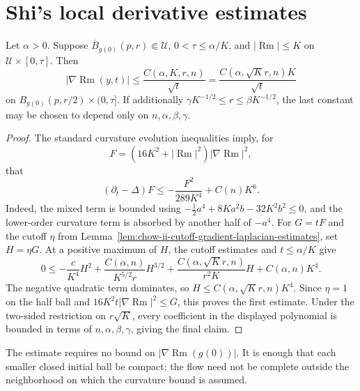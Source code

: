 \section{Shi's local derivative estimates}

\begin{theorem}
\label{thm:chow-ii-shi-local-first-derivative-estimate}


Let \(\alpha>0\).  Suppose \(\overline B_{g(0)}(p,r)\Subset\mathcal U\),
\(0<\tau\le\alpha/K\), and \(|\operatorname{Rm}|\le K\) on
\(\mathcal U\times[0,\tau]\).  Then
\[
|\nabla\operatorname{Rm}(y,t)|\le
\frac{C(\alpha,K,r,n)}{\sqrt t}
=\frac{C(\alpha,\sqrt K r,n)K}{\sqrt t}
\]
on \(B_{g(0)}(p,r/2)\times(0,\tau]\).  If additionally
\(\gamma K^{-1/2}\le r\le\beta K^{-1/2}\), the last constant may be chosen
to depend only on \(n,\alpha,\beta,\gamma\).
\end{theorem}
\begin{proof}
\sketch The standard curvature evolution inequalities imply, for
\[
F=(16K^2+|\operatorname{Rm}|^2)|\nabla\operatorname{Rm}|^2,
\]
that
\[
(\partial_t-\Delta)F\le-\frac{F^2}{289K^4}+C(n)K^6.
\]
Indeed, the mixed term is bounded using
\(-\tfrac12a^4+8Ka^2b-32K^2b^2\le0\), and the lower-order curvature term is
absorbed by another half of \(-a^4\).  For \(G=tF\) and the cutoff \(\eta\)
from Lemma~\ref{lem:chow-ii-cutoff-gradient-laplacian-estimates}, set
\(H=\eta G\).  At a positive maximum of \(H\), the cutoff estimates and
\(t\le\alpha/K\) give
\[
0\le-\frac c{K^4}H^2
+\frac{C(\alpha,n)}{K^{5/2}r}H^{3/2}
+\frac{C(\alpha,\sqrt K r,n)}{r^2K}H+C(\alpha,n)K^4.
\]
The negative quadratic term dominates, so
\(H\le C(\alpha,\sqrt K r,n)K^4\).  Since \(\eta=1\) on the half ball and
\(16K^2t|\nabla\operatorname{Rm}|^2\le G\), this proves the first estimate.  Under the
two-sided restriction on \(r\sqrt K\), every coefficient in the displayed
polynomial is bounded in terms of \(n,\alpha,\beta,\gamma\), giving the final
claim.
\end{proof}

\begin{remark}
\label{rem:chow-ii-local-first-estimate-initial-data}


The estimate requires no bound on \(|\nabla\operatorname{Rm}(g(0))|\).  It is enough that
each smaller closed initial ball be compact; the flow need not be complete
outside the neighborhood on which the curvature bound is assumed.
\end{remark}

